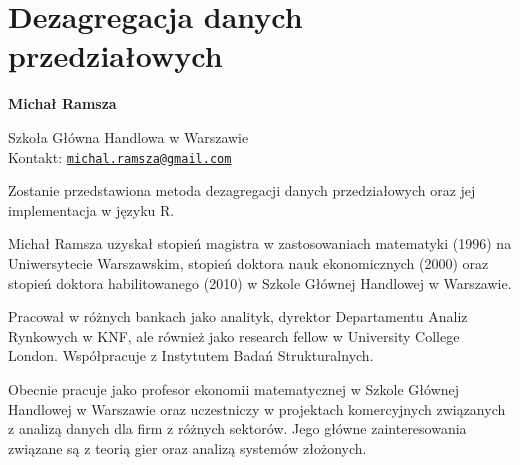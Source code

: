 \documentclass[\main/boa.tex]{subfiles}
\begin{document}
\section{Dezagregacja danych przedziałowych}


\begin{minipage}{0.915\textwidth}
	\centering
  {\bf \huge {} Michał Ramsza}
\end{minipage}


\vskip 0.3cm

\begin{affiliations}
\begin{minipage}{0.915\textwidth}
\centering
\large Szkoła Główna Handlowa w Warszawie \\[5pt]
Kontakt: \href{mailto:michal.ramsza@gmail.com}{\nolinkurl{michal.ramsza@gmail.com}}\\
\end{minipage}
\end{affiliations}

\vskip 0.8cm

Zostanie przedstawiona metoda dezagregacji danych przedziałowych oraz jej implementacja w języku R. 

\bio
Michał Ramsza uzyskał stopień magistra w zastosowaniach matematyki (1996) na Uniwersytecie Warszawskim, stopień doktora nauk ekonomicznych (2000) oraz stopień doktora habilitowanego (2010) w Szkole Głównej Handlowej w Warszawie.

Pracował w różnych bankach jako analityk, dyrektor Departamentu Analiz Rynkowych w KNF, ale również jako research fellow w University College London. Współpracuje z Instytutem Badań Strukturalnych.

Obecnie pracuje jako profesor ekonomii matematycznej w Szkole Głównej Handlowej w Warszawie oraz uczestniczy w projektach komercyjnych związanych z analizą danych dla firm z różnych sektorów. Jego główne zainteresowania związane są z teorią gier oraz analizą systemów złożonych.
\end{document}
